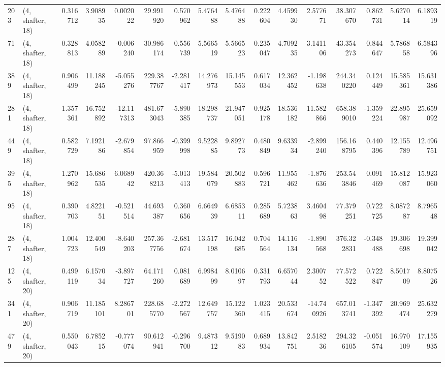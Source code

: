 \begin{tabular}{llrrrrrrrrrrrrrr}
203 &  (4, shafter, 18) &   0.316712 &   3.908935 &   0.002022 &    29.991920 &   0.570962 &   5.476488 &   5.476488 &  0.222604 &   4.459930 &   2.577671 &     38.307670 &    0.862731 &    5.627014 &    6.189319 \\
71  &  (4, shafter, 18) &   0.328813 &   4.058289 &  -0.006240 &    30.986174 &   0.556739 &   5.566519 &   5.566523 &  0.235047 &   4.709235 &   3.141106 &     43.354273 &    0.844647 &    5.786858 &    6.584396 \\
389 &  (4, shafter, 18) &   0.906499 &  11.188245 &  -5.055276 &   229.387767 &  -2.281417 &  14.276973 &  15.145553 &  0.617034 &  12.362452 &  -1.198638 &    244.340220 &    0.124449 &   15.585361 &   15.631386 \\
281 &  (4, shafter, 18) &   1.357361 &  16.752892 & -12.117313 &   481.673043 &  -5.890385 &  18.298737 &  21.947051 &  0.925178 &  18.536182 &  11.582866 &    658.389010 &   -1.359224 &   22.895987 &   25.659092 \\
449 &  (4, shafter, 18) &   0.582729 &   7.192186 &  -2.679854 &    97.866959 &  -0.399998 &   9.522885 &   9.892773 &  0.480849 &   9.633934 &  -2.899240 &    156.168795 &    0.440396 &   12.155789 &   12.496751 \\
395 &  (4, shafter, 18) &   1.270962 &  15.686535 &   6.068942 &   420.368213 &  -5.013413 &  19.584079 &  20.502883 &  0.596721 &  11.955462 &  -1.876636 &    253.543846 &    0.091469 &   15.812087 &   15.923060 \\
95  &  (4, shafter, 18) &   0.390703 &   4.822151 &  -0.521514 &    44.693387 &   0.360656 &   6.664939 &   6.685311 &  0.285689 &   5.723863 &   3.460498 &     77.379251 &    0.722725 &    8.087287 &    8.796548 \\
287 &  (4, shafter, 18) &   1.004723 &  12.400549 &  -8.640203 &   257.367756 &  -2.681674 &  13.517198 &  16.042685 &  0.704564 &  14.116134 &  -1.890568 &    376.322831 &   -0.348488 &   19.306698 &   19.399042 \\
125 &  (4, shafter, 20) &   0.499119 &   6.157034 &  -3.897727 &    64.171260 &   0.081689 &   6.998499 &   8.010697 &  0.331793 &   6.657044 &   2.300752 &     77.572522 &    0.722847 &    8.501709 &    8.807526 \\
341 &  (4, shafter, 20) &   0.906719 &  11.185101 &   8.286701 &   228.685770 &  -2.272567 &  12.649757 &  15.122360 &  1.023415 &  20.533674 & -14.740926 &    657.013741 &   -1.347392 &   20.969474 &   25.632279 \\
479 &  (4, shafter, 20) &   0.550043 &   6.785215 &  -0.777074 &    90.612941 &  -0.296700 &   9.487312 &   9.519083 &  0.689934 &  13.842751 &   2.518236 &    294.326105 &   -0.051574 &   16.970109 &   17.155935 \\

\end{tabular}
